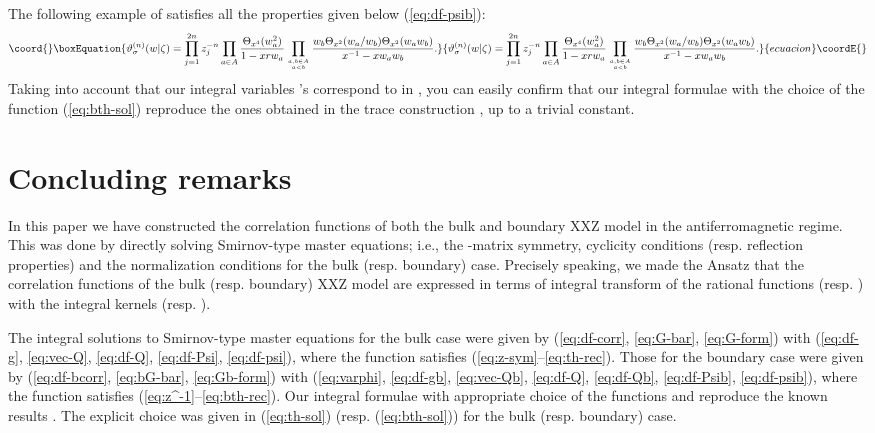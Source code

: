 \documentclass[a4paper,10pt]{article}
\begin{document}
{The following example of \coordHE{} satisfies 
all the properties given below (\ref{eq:df-psib}): 
\begin{equation}\coord{}\boxEquation{
\vartheta^{(n)}_\sigma (w|\zeta )
=\prod_{j=1}^{2n}z_j^{-n} 
\prod_{a\in A} \frac{\Theta_{x^4} (w_a^{2})}{1-xrw_a}
\prod_{a,b\in A\atop a<b} \frac{w_b 
\Theta_{x^2} (w_a /w_b )\Theta_{x^2} (w_a w_b )}
{x^{-1}-xw_a w_b}. 
\label{eq:bth-sol}
}{
\vartheta^{(n)}_\sigma (w|\zeta )
=\prod_{j=1}^{2n}z_j^{-n} 
\prod_{a\in A} \frac{\Theta_{x^4} (w_a^{2})}{1-xrw_a}
\prod_{a,b\in A\atop a<b} \frac{w_b 
\Theta_{x^2} (w_a /w_b )\Theta_{x^2} (w_a w_b )}
{x^{-1}-xw_a w_b}. 
}{ecuacion}\coordE{}\end{equation}
Taking into account that our integral variables \coordHE{}'s 
correspond to \coordHE{} in \cite{JKKKM}, 
you can easily confirm that our integral 
formulae with the choice of the function 
\coordHE{} (\ref{eq:bth-sol}) 
reproduce the ones obtained in the trace 
construction \cite{JKKKM}, up to a trivial constant. 

\section{Concluding remarks} 

In this paper we have constructed the correlation 
functions of both the bulk and boundary XXZ model in the 
antiferromagnetic regime. This was done by directly solving 
Smirnov-type master equations; i.e., the \coordHE{}-matrix symmetry, 
cyclicity conditions (resp. reflection properties) and 
the normalization conditions for the bulk (resp. boundary) 
case. Precisely speaking, we made the Ansatz that the 
correlation functions of the bulk (resp. boundary) XXZ model 
are expressed in terms of integral transform of the rational 
functions \coordHE{} 
(resp. \coordHE{}) with the integral 
kernels \coordHE{} (resp. 
\coordHE{}). 

The integral solutions to Smirnov-type master 
equations for the bulk case were given by 
(\ref{eq:df-corr}, \ref{eq:G-bar}, \ref{eq:G-form}) 
with (\ref{eq:df-g}, \ref{eq:vec-Q}, \ref{eq:df-Q}, 
\ref{eq:df-Psi}, \ref{eq:df-psi}), where 
the function \coordHE{} 
satisfies (\ref{eq:z-sym}--\ref{eq:th-rec}). Those for 
the boundary case were given by 
(\ref{eq:df-bcorr}, \ref{eq:bG-bar}, \ref{eq:Gb-form}) 
with (\ref{eq:varphi}, \ref{eq:df-gb}, \ref{eq:vec-Qb}, 
\ref{eq:df-Q}, \ref{eq:df-Qb}, \ref{eq:df-Psib}, 
\ref{eq:df-psib}), where the function 
\coordHE{} satisfies 
(\ref{eq:z^-1}--\ref{eq:bth-rec}). Our integral formulae 
with appropriate choice of the functions 
\coordHE{} and 
\coordHE{} reproduce the 
known results \cite{CORR,JKKKM}. The explicit choice was 
given in (\ref{eq:th-sol}) (resp. (\ref{eq:bth-sol})) 
for the bulk (resp. boundary) case. 

}
\end{document}
